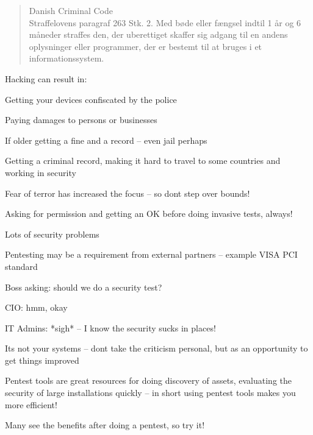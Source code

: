 \documentclass[Screen16to9,17pt]{foils}
\begin{document}

\begin{quote}\small
Danish Criminal Code\\
Straffelovens paragraf 263 Stk. 2. Med bøde eller fængsel indtil 1 år og 6 måneder straffes den, der uberettiget skaffer sig adgang til en andens oplysninger eller programmer, der er bestemt til at bruges i et informationssystem.
\end{quote}

Hacking can result in:
\begin{list2}
\item Getting your devices confiscated by the police
\item Paying damages to persons or businesses
\item If older getting a fine and a record -- even jail perhaps
\item Getting a criminal record, making it hard to travel to some countries and working in security
\item Fear of terror has increased the focus -- so dont step over bounds!
\end{list2}

Asking for permission and getting an OK before doing invasive tests, always!



\begin{list1}
\item Lots of security problems
\item Pentesting may be a requirement from external partners -- example VISA PCI standard
\end{list1}

\begin{list2}
\item Boss asking: should we do a security test?
\item CIO: hmm, okay
\item IT Admins: *sigh* -- I know the security sucks in places!
\item Its not your systems -- dont take the criticism personal, but as an opportunity to get things improved
\vskip 1cm
\item Pentest tools are great resources for doing discovery of assets, evaluating the security of large installations quickly -- in short using pentest tools makes you more efficient!
\end{list2}

\centerline{\Large Many see the benefits after doing a pentest, so try it!}
\end{document}
